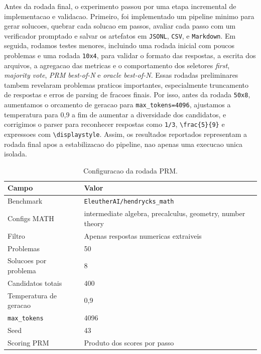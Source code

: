 \documentclass[a4paper,12pt]{article}
\begin{document}
Antes da rodada final, o experimento passou por uma etapa incremental de
implementacao e validacao. Primeiro, foi implementado um pipeline minimo para
gerar solucoes, quebrar cada solucao em passos, avaliar cada passo com um
verificador promptado e salvar os artefatos em \texttt{JSONL}, \texttt{CSV}, e
\texttt{Markdown}. Em seguida, rodamos testes menores, incluindo uma
rodada inicial com poucos problemas e uma rodada \texttt{10x4}, para validar o
formato das respostas, a escrita dos arquivos, a agregacao das metricas e o
comportamento dos seletores \emph{first}, \emph{majority vote},
\emph{PRM best-of-N} e \emph{oracle best-of-N}. Essas rodadas preliminares
tambem revelaram problemas praticos importantes, especialmente truncamento de
respostas e erros de parsing de fracoes finais. Por isso, antes da rodada
\texttt{50x8}, aumentamos o orcamento de geracao para
\texttt{max\_tokens=4096}, ajustamos a temperatura para 0,9 a fim de aumentar a
diversidade dos candidatos, e corrigimos o parser para reconhecer respostas
como \texttt{1/3}, \verb|\frac{5}{9}| e expressoes com \verb|\displaystyle|.
Assim, os resultados reportados representam a rodada final apos a estabilizacao
do pipeline, nao apenas uma execucao unica isolada.


\begin{table}[h]
\centering
\caption{Configuracao da rodada PRM.}
\label{tab:prm_setup}
\begin{tabular}{ll}
\toprule
Campo & Valor \\
\midrule
Benchmark & \texttt{EleutherAI/hendrycks\_math} \\
Configs MATH & intermediate algebra, precalculus, geometry, number theory \\
Filtro & Apenas respostas numericas extraiveis \\
Problemas & 50 \\
Solucoes por problema & 8 \\
Candidatos totais & 400 \\
Temperatura de geracao & 0,9 \\
\texttt{max\_tokens} & 4096 \\
Seed & 43 \\
Scoring PRM & Produto dos scores por passo \\
\bottomrule
\end{tabular}
\end{table}
\end{document}
